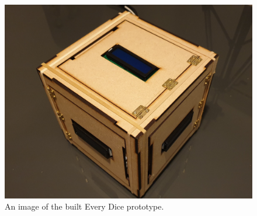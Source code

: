 \begin{figure}[ht!]
	\centering


	\includegraphics[width=0.8\linewidth]{./figures/hardware.jpg}
	
	\caption[The Built Every Dice]{An image of the built Every Dice prototype.}
	
	\label{fig:dice_hardware}
	
\end{figure}